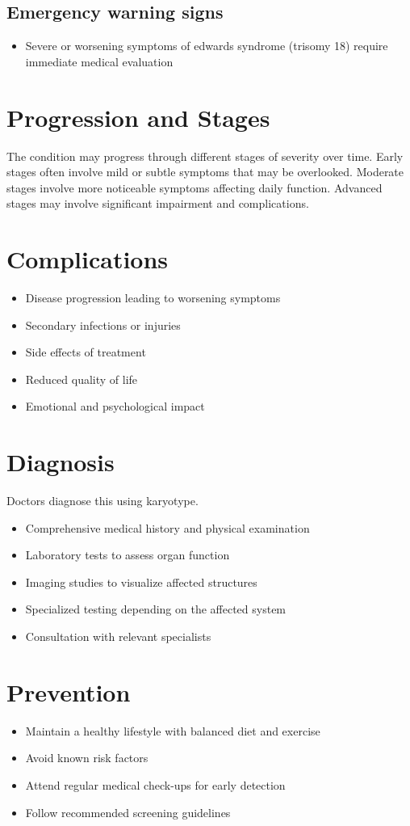 \subsection{Emergency warning signs}
\begin{itemize}[noitemsep]
  \item Severe or worsening symptoms of edwards syndrome (trisomy 18) require immediate medical evaluation
\end{itemize}
\section{Progression and Stages}
The condition may progress through different stages of severity over time. Early stages often involve mild or subtle symptoms that may be overlooked. Moderate stages involve more noticeable symptoms affecting daily function. Advanced stages may involve significant impairment and complications.
\section{Complications}
\begin{itemize}[noitemsep]
  \item Disease progression leading to worsening symptoms
  \item Secondary infections or injuries
  \item Side effects of treatment
  \item Reduced quality of life
  \item Emotional and psychological impact
\end{itemize}
\section{Diagnosis}
Doctors diagnose this using karyotype.

\begin{itemize}[noitemsep]
  \item Comprehensive medical history and physical examination
  \item Laboratory tests to assess organ function
  \item Imaging studies to visualize affected structures
  \item Specialized testing depending on the affected system
  \item Consultation with relevant specialists
\end{itemize}
\section{Prevention}
\begin{itemize}[noitemsep]
  \item Maintain a healthy lifestyle with balanced diet and exercise
  \item Avoid known risk factors
  \item Attend regular medical check-ups for early detection
  \item Follow recommended screening guidelines
\end{itemize}

